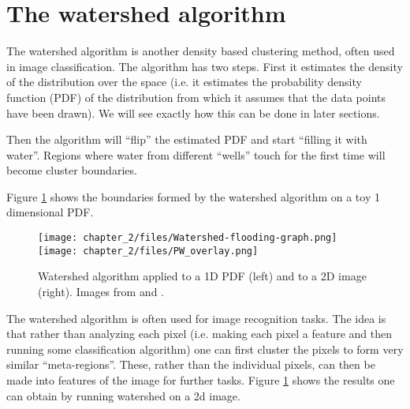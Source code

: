 \section{The watershed algorithm}
  The watershed algorithm is another density based clustering method, often used in image classification.
  The algorithm has two steps. First it estimates the density of the distribution over the space (i.e. 
  it estimates the probability density function (PDF) of the distribution from which it assumes that the data points
  have been drawn). We will see exactly how this can be done in later sections. 
  
  Then the algorithm will ``flip'' the estimated PDF and start ``filling it with water''. Regions where water from different
  ``wells'' touch for the first time will become cluster boundaries.
  
  Figure \ref{watershed} shows the boundaries formed by the watershed algorithm on a toy 1 dimensional PDF.
  
  \begin{figure}[h]
  \centering
  \texttt{[image: chapter\_2/files/Watershed-flooding-graph.png]}
  \texttt{[image: chapter\_2/files/PW\_overlay.png]}
  \caption{Watershed algorithm applied to a 1D PDF (left) and to a 2D image (right). Images from \cite{cou09} and \cite{arg14}.}
  \label{watershed}
  \end{figure}
  
  The watershed algorithm is often used for image recognition tasks. The idea is that rather than 
  analyzing each pixel (i.e. making each pixel a feature and then running some classification algorithm)
  one can first cluster the pixels to form very similar ``meta-regions''. These, rather than the individual pixels,
  can then be made into features of the image for further tasks. Figure \ref{watershed} shows the results one can
  obtain by running watershed on a 2d image.
  

